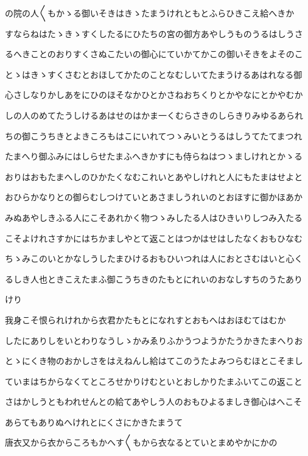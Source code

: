\documentclass[a4paper,11pt,landscape]{ltjtarticle}
\begin{document}
\par\medskip
の院の人〱もかゝる御いそきはきゝたまうけれともとふらひきこえ給へきか
\par\medskip
すならねはたゝきゝすくしたるにひたちの宮の御方あやしうものうるはしうさ
\par\medskip
るへきことのおりすくさぬこたいの御心にていかてかこの御いそきをよそのこ
\par\medskip
とゝはきゝすくさむとおほしてかたのことなむしいてたまうけるあはれなる御
\par\medskip
心さしなりかしあをにひのほそなかひとかさねおちくりとかやなにとかやむか
\par\medskip
しの人のめてたうしけるあはせのはかま一くむらさきのしらきりみゆるあられ
\par\medskip
ちの御こうちきとよきころもはこにいれてつゝみいとうるはしうてたてまつれ
\par\medskip
たまへり御ふみにはしらせたまふへきかすにも侍らねはつゝましけれとかゝる
\par\medskip
おりはおもたまへしのひかたくなむこれいとあやしけれと人にもたまはせよと
\par\medskip
おひらかなりとの御らむしつけていとあさましうれいのとおほすに御かほあか
\par\medskip
みぬあやしきふる人にこそあれかく物つゝみしたる人はひきいりしつみ入たる
\par\medskip
こそよけれさすかにはちかましやとて返ことはつかはせはしたなくおもひなむ
\par\medskip
ちゝみこのいとかなしうしたまひけるおもひいつれは人におとさむはいと心く
\par\medskip
るしき人也ときこえたまふ御こうちきのたもとにれいのおなしすちのうたあり
\par\medskip
けり
\par\medskip
我身こそ恨られけれから衣君かたもとになれすとおもへはおほむてはむか
\par\medskip
したにありしをいとわりなうしゝかみゑりふかうつようかたうかきたまへりお
\par\medskip
とゝにくき物のおかしさをはえねんし給はてこのうたよみつらむほとこそまし
\par\medskip
ていまはちからなくてところせかりけむといとおしかりたまふいてこの返こと
\par\medskip
さはかしうともわれせんとの給てあやしう人のおもひよるましき御心はへこそ
\par\medskip
あらてもありぬへけれとにくさにかきたまうて
\par\medskip
唐衣又から衣からころもかへす〱もから衣なるとていとまめやかにかの
\end{document}
